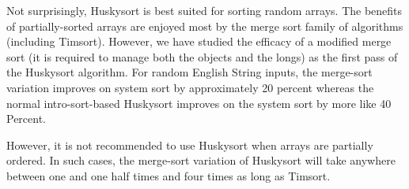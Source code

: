 \documentclass[acmtog]{acmart}
\begin{document}
Not surprisingly, Huskysort is best suited for sorting random arrays.
The benefits of partially-sorted arrays are enjoyed most by the merge sort family of algorithms (including Timsort).
However, we have studied the efficacy of a modified merge sort (it is required to manage both the objects and the longs) as the first pass of the Huskysort algorithm.
For random English String inputs, the merge-sort variation improves on system sort by approximately 20 percent whereas the normal intro-sort-based Huskysort improves on the system sort by more like 40 Percent.

However, it is not recommended to use Huskysort when arrays are partially ordered.
In such cases, the merge-sort variation of Huskysort will take anywhere between one and one half times and four times as long as Timsort.
\end{document}
